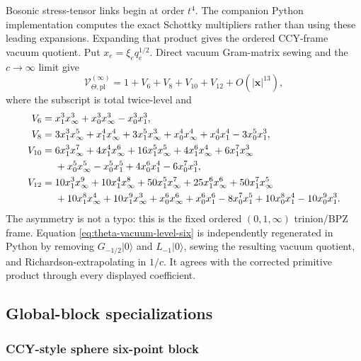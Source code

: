 \documentclass[11pt]{article}
\newcommand{\V}{\mathcal V}
\begin{document}
Bosonic stress-tensor links begin at order \(t^4\).  The companion Python
implementation computes the exact Schottky multipliers rather than using
these leading expansions.  Expanding that product gives the ordered
CCY-frame vacuum quotient.  Put
\(x_e=\xi_e q_e^{1/2}\).  Direct vacuum Gram-matrix sewing and the
\(c\to\infty\) limit give
\begin{equation}
 \V_{\Theta,\mathrm{pl}}^{(\infty)}
 =1+V_6+V_8+V_{10}+V_{12}+O(|\bm x|^{13}),
 \label{eq:theta-vacuum-level-six}
\end{equation}
where the subscript is total twice-level and
\begin{align}
 V_6={}&x_1^3x_\infty^3+x_0^3x_\infty^3-x_0^3x_1^3,
 \notag\\
 V_8={}&3x_1^3x_\infty^5+x_1^4x_\infty^4+3x_1^5x_\infty^3
 +x_0^4x_\infty^4+x_0^4x_1^4-3x_0^5x_1^3,
 \notag\\
 V_{10}={}&6x_1^3x_\infty^7+4x_1^4x_\infty^6
 +16x_1^5x_\infty^5+4x_1^6x_\infty^4+6x_1^7x_\infty^3
 \notag\\
 &+x_0^5x_\infty^5-x_0^5x_1^5
 +4x_0^6x_1^4-6x_0^7x_1^3,
 \notag\\
 V_{12}={}&10x_1^3x_\infty^9+10x_1^4x_\infty^8
 +50x_1^5x_\infty^7+25x_1^6x_\infty^6
 +50x_1^7x_\infty^5
 \notag\\
 &+10x_1^8x_\infty^4+10x_1^9x_\infty^3
 +x_0^6x_\infty^6+x_0^6x_1^6
 -8x_0^7x_1^5+10x_0^8x_1^4-10x_0^9x_1^3.
 \label{eq:theta-vacuum-level-six-components}
\end{align}
The asymmetry is not a typo: this is the fixed ordered
\((0,1,\infty)\) trinion/BPZ frame.  Equation
\eqref{eq:theta-vacuum-level-six} is independently regenerated in Python by
removing \(G_{-1/2}|0\rangle\) and \(L_{-1}|0\rangle\), sewing the resulting
vacuum quotient, and Richardson-extrapolating in \(1/c\).  It agrees with
the corrected primitive product through every displayed coefficient.

\subsection{Global-block specializations}

\subsubsection{CCY-style sphere six-point block}
\end{document}
